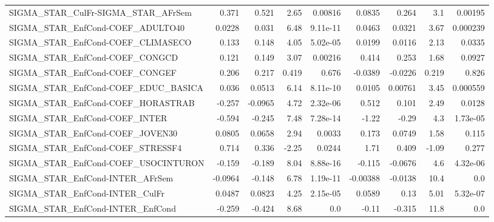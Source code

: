 \begin{tabular}{lrrrrrrrr}
SIGMA\_STAR\_CulFr-SIGMA\_STAR\_AFrSem    &       0.371 &        0.521 &    2.65 &  0.00816 &     0.0835 &       0.264 &          3.1 &       0.00195 \\
SIGMA\_STAR\_EnfCond-COEF\_ADULTO40      &      0.0228 &        0.031 &    6.48 & 9.11e-11 &     0.0463 &      0.0321 &         3.67 &      0.000239 \\
SIGMA\_STAR\_EnfCond-COEF\_CLIMASECO     &       0.133 &        0.148 &    4.05 & 5.02e-05 &     0.0199 &      0.0116 &         2.13 &        0.0335 \\
SIGMA\_STAR\_EnfCond-COEF\_CONGCD        &       0.121 &        0.149 &    3.07 &  0.00216 &      0.414 &       0.253 &         1.68 &        0.0927 \\
SIGMA\_STAR\_EnfCond-COEF\_CONGEF        &       0.206 &        0.217 &   0.419 &    0.676 &    -0.0389 &     -0.0226 &        0.219 &         0.826 \\
SIGMA\_STAR\_EnfCond-COEF\_EDUC\_BASICA   &       0.036 &       0.0513 &    6.14 & 8.11e-10 &     0.0105 &     0.00761 &         3.45 &      0.000559 \\
SIGMA\_STAR\_EnfCond-COEF\_HORASTRAB     &      -0.257 &      -0.0965 &    4.72 & 2.32e-06 &      0.512 &       0.101 &         2.49 &        0.0128 \\
SIGMA\_STAR\_EnfCond-COEF\_INTER         &      -0.594 &       -0.245 &    7.48 & 7.28e-14 &      -1.22 &       -0.29 &          4.3 &      1.73e-05 \\
SIGMA\_STAR\_EnfCond-COEF\_JOVEN30       &      0.0805 &       0.0658 &    2.94 &   0.0033 &      0.173 &      0.0749 &         1.58 &         0.115 \\
SIGMA\_STAR\_EnfCond-COEF\_STRESSF4      &       0.714 &        0.336 &   -2.25 &   0.0244 &       1.71 &       0.409 &        -1.09 &         0.277 \\
SIGMA\_STAR\_EnfCond-COEF\_USOCINTURON   &      -0.159 &       -0.189 &    8.04 & 8.88e-16 &     -0.115 &     -0.0676 &          4.6 &      4.32e-06 \\
SIGMA\_STAR\_EnfCond-INTER\_AFrSem       &     -0.0964 &       -0.148 &    6.78 & 1.19e-11 &   -0.00388 &     -0.0138 &         10.4 &           0.0 \\
SIGMA\_STAR\_EnfCond-INTER\_CulFr        &      0.0487 &       0.0823 &    4.25 & 2.15e-05 &     0.0589 &        0.13 &         5.01 &      5.32e-07 \\
SIGMA\_STAR\_EnfCond-INTER\_EnfCond      &      -0.259 &       -0.424 &    8.68 &      0.0 &      -0.11 &      -0.315 &         11.8 &           0.0 \\

\end{tabular}
